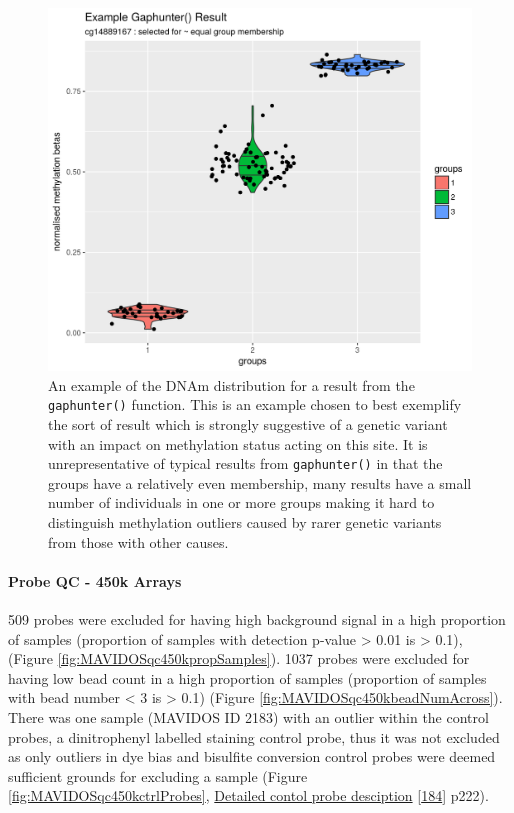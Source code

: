 \documentclass[
]{book}
\begin{document}
\begin{figure}

{\centering \includegraphics[width=0.8\linewidth]{figs/MAVIDOSgaphunterEgMonApr162018} 

}

\caption{An example of the DNAm distribution for a result from the \texttt{gaphunter()} function. This is an example chosen to best exemplify the sort of result which is strongly suggestive of a genetic variant with an impact on methylation status acting on this site. It is unrepresentative of typical results from \texttt{gaphunter()} in that the groups have a relatively even membership, many results have a small number of individuals in one or more groups making it hard to distinguish methylation outliers caused by rarer genetic variants from those with other causes.}\label{fig:MAVIDOSgaphunterEgMonApr162018}
\end{figure}



\hypertarget{probe-qc---450k-arrays}{%
\paragraph{Probe QC - 450k Arrays}\label{probe-qc---450k-arrays}}

509 probes were excluded for having high background signal in a high proportion of samples (proportion of samples with detection p-value \textgreater{} 0.01 is \textgreater{} 0.1), (Figure \ref{fig:MAVIDOSqc450kpropSamples}).
1037 probes were excluded for having low bead count in a high proportion of samples (proportion of samples with bead number \textless{} 3 is \textgreater{} 0.1) (Figure \ref{fig:MAVIDOSqc450kbeadNumAcross}).
There was one sample (MAVIDOS ID 2183) with an outlier within the control probes, a dinitrophenyl labelled staining control probe, thus it was not excluded as only outliers in dye bias and bisulfite conversion control probes were deemed sufficient grounds for excluding a sample (Figure \ref{fig:MAVIDOSqc450kctrlProbes}, \href{https://support.illumina.com/content/dam/illumina-support/documents/documentation/chemistry_documentation/infinium_assays/infinium_hd_methylation/infinium-hd-methylation-guide-15019519-01.pdf}{Detailed contol probe desciption} {[}\protect\hyperlink{ref-Illumina2015}{184}{]} p222).
\end{document}
